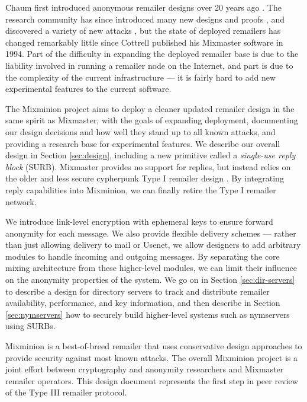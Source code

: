 \documentclass{llncs}
\begin{document}
Chaum first introduced anonymous remailer designs over 20 years ago
\cite{chaum-mix}. The research community has since introduced many new
designs and proofs
\cite{abe,web-mix,babel,flash-mix,realtime-mix,kesdogan,shuffle,hybrid-mix},
and discovered a variety of new attacks
\cite{back-traffic-analysis,langos02,disad-free-routes,desmedt,mitkuro,raymond00},
but the state of deployed remailers has changed remarkably little since
Cottrell published his Mixmaster software \cite{mixmaster-attacks} in 1994. 
Part of the difficulty in expanding the deployed remailer base is
due to the liability involved in running a remailer node on the Internet,
and part is due to the complexity of the current infrastructure ---
it is fairly hard to add new experimental features to the current software.

The Mixminion project aims to deploy a cleaner updated remailer design
in the same spirit as Mixmaster, with the goals of expanding
deployment, documenting our design decisions and how well they stand
up to all known attacks, and providing a research base for
experimental features. We describe our overall design in Section
\ref{sec:design}, including a new primitive called a \emph{single-use
reply block} (SURB).  Mixmaster provides no support for replies, but
instead relies on the older and less secure cypherpunk Type I remailer
design \cite{remailer-history}. By integrating reply capabilities into
Mixminion, we can finally retire the Type I remailer network.

We introduce link-level encryption with ephemeral keys to ensure forward
anonymity for each message. We also provide flexible delivery schemes ---
rather than just allowing delivery to mail or Usenet, we allow designers
to add arbitrary modules to handle incoming and outgoing messages. By
separating the core mixing architecture from these higher-level modules,
we can limit their influence on the anonymity properties of the system. We
go on in Section \ref{sec:dir-servers} to describe a design for directory
servers to track and distribute remailer availability, performance,
and key information, and then describe in Section \ref{sec:nymservers}
how to securely build higher-level systems such as nymservers using SURBs.

Mixminion is a best-of-breed remailer that uses conservative design
approaches to provide security against most known attacks. The overall
Mixminion project is a joint effort between cryptography and anonymity
researchers and Mixmaster remailer operators. This design document
represents the first step in peer review of the Type III remailer
protocol.
\end{document}
